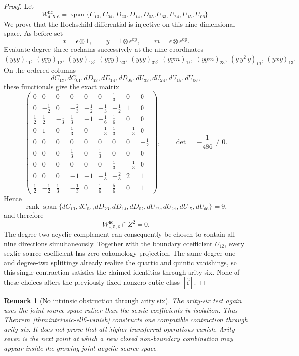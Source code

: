 \documentclass[11pt]{amsart}
\newtheorem{remark}[theorem]{Remark}
\newcommand{\Span}{\operatorname{span}}
\newcommand{\rank}{\operatorname{rank}}
\begin{document}
\begin{proof}
Let
\[
W_{4,5,6}^{\mathrm{nc}}
=
\Span\{C_{13},C_{04},D_{23},D_{14},D_{05},U_{33},U_{24},U_{15},U_{06}\}.
\]
We prove that the Hochschild differential is injective on this nine-dimensional space.  As before set
\[
x=\epsilon\otimes1,
\qquad
y=1\otimes\epsilon^{\mathrm{op}},
\qquad
m=\epsilon\otimes\epsilon^{\mathrm{op}}.
\]
Evaluate degree-three cochains successively at the nine coordinates
\[
(yyy)_{11},\ (yyy)_{12},\ (yyy)_{13},\ (yyy)_{23},\ (yyy)_{32},\
(yym)_{13},\ (yym)_{23},\ (y\,y^2\,y)_{13},\ (yxy)_{13}.
\]
On the ordered columns
\[
dC_{13},dC_{04},dD_{23},dD_{14},dD_{05},dU_{33},dU_{24},dU_{15},dU_{06},
\]
these functionals give the exact matrix
\begin{equation}\label{eq:arity6-minor}
\begin{pmatrix}
0&0&0&0&0&0&\tfrac13&0&0\\
0&-\tfrac12&0&-\tfrac23&-\tfrac12&-\tfrac13&-\tfrac12&1&0\\
\tfrac12&\tfrac12&-\tfrac13&\tfrac13&-1&-\tfrac16&\tfrac16&0&0\\
0&1&0&\tfrac13&0&-\tfrac13&\tfrac13&-\tfrac13&0\\
0&0&0&0&0&0&0&0&-\tfrac12\\
0&0&0&\tfrac13&0&\tfrac13&0&0&0\\
0&0&0&0&0&0&\tfrac13&-\tfrac13&0\\
0&0&0&-1&-1&-\tfrac13&-\tfrac23&2&1\\
\tfrac12&-\tfrac12&\tfrac13&-\tfrac13&0&\tfrac16&\tfrac56&0&1
\end{pmatrix},
\qquad
\det=-\frac1{486}\ne0.
\end{equation}
Hence
\[
\rank\Span\{dC_{13},dC_{04},dD_{23},dD_{14},dD_{05},dU_{33},dU_{24},dU_{15},dU_{06}\}=9,
\]
and therefore
\[
W_{4,5,6}^{\mathrm{nc}}\cap Z^2=0.
\]
The degree-two acyclic complement can consequently be chosen to contain all nine directions simultaneously.  Together with the boundary coefficient $U_{42}$, every sextic source coefficient has zero cohomology projection.  The same degree-one and degree-two splittings already realize the quartic and quintic vanishings, so this single contraction satisfies the claimed identities through arity six.  None of these choices alters the previously fixed nonzero cubic class $[\widehat\zeta]$.
\end{proof}

\begin{remark}[No intrinsic obstruction through arity six]\label{rem:no-obstruction-through-six}
The arity-six test again uses the joint source space rather than the sextic coefficients in isolation.  Thus Theorem~\ref{thm:intrinsic-ell6-vanish} constructs one compatible contraction through arity six.  It does \emph{not} prove that all higher transferred operations vanish.  Arity seven is the next point at which a new closed non-boundary combination may appear inside the growing joint acyclic source space.
\end{remark}
\end{document}
